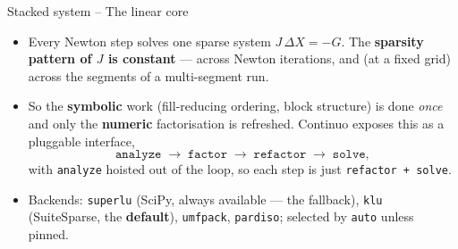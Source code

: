 \documentclass[11pt,aspectratio=169]{beamer}
\begin{document}
\begin{frame}{Stacked system -- The linear core}

\begin{itemize}

\item Every Newton step solves one sparse system $J\,\Delta X = -G$. The
  \textbf{sparsity pattern of $J$ is constant} — across Newton iterations,
  and (at a fixed grid) across the segments of a multi-segment run.\newline

\item So the \textbf{symbolic} work (fill-reducing ordering, block structure)
  is done \emph{once} and only the \textbf{numeric} factorisation is
  refreshed. Continuo exposes this as a pluggable interface,
  \[
  \texttt{analyze} \;\to\; \texttt{factor} \;\to\; \texttt{refactor}
  \;\to\; \texttt{solve},
  \]
  with \texttt{analyze} hoisted out of the loop, so each step is just
  \texttt{refactor + solve}.\newline

\item Backends: \texttt{superlu} (SciPy, always available — the fallback),
  \texttt{klu} (SuiteSparse, the \textbf{default}), \texttt{umfpack},
  \texttt{pardiso}; selected by \texttt{auto} unless pinned.

\end{itemize}

\end{frame}
\end{document}
